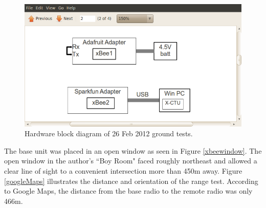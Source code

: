 \documentclass[11pt,letterpaper]{article}
\begin{document}
\begin{figure}[htb]
\begin{center}
\includegraphics[scale=.6, trim = 10mm 10mm 10mm 40mm, clip]{hardwareBlockDiagram.png}
\centering
\caption{Hardware block diagram of 26 Feb 2012 ground tests.}
\label{figHardwareBlockDiagram}
\end{center}
\end{figure}

The base unit was placed in an open window as seen in Figure \ref{xbeewindow}.  The open window in the author's ``Boy Room" faced roughly northeast and allowed a clear line of sight to a convenient intersection more than 450m away.  Figure \ref{googleMaps} illustrates the distance and orientation of the range test.  According to Google Maps, the distance from the base radio to the remote radio was only 466m.
\end{document}
